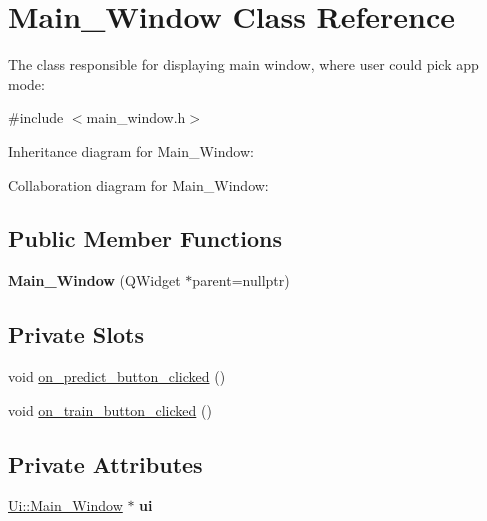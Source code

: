 \hypertarget{classMain__Window}{}\section{Main\+\_\+\+Window Class Reference}
\label{classMain__Window}


The class responsible for displaying main window, where user could pick app mode\+:  




{\ttfamily \#include $<$main\+\_\+window.\+h$>$}



Inheritance diagram for Main\+\_\+\+Window\+:


Collaboration diagram for Main\+\_\+\+Window\+:
\subsection*{Public Member Functions}
\begin{DoxyCompactItemize}
\item 
\mbox{\label{classMain__Window_a74de7d059afe56907e349276d60910d1}} 
{\bfseries Main\+\_\+\+Window} (Q\+Widget $\ast$parent=nullptr)
\end{DoxyCompactItemize}
\subsection*{Private Slots}
\begin{DoxyCompactItemize}
\item 
void \hyperlink{classMain__Window_a152cfc3e430cff4fb23f07ef43afaeb5}{on\+\_\+predict\+\_\+button\+\_\+clicked} ()
\item 
void \hyperlink{classMain__Window_a4081b8f068e82535e5a0f00924221c21}{on\+\_\+train\+\_\+button\+\_\+clicked} ()
\end{DoxyCompactItemize}
\subsection*{Private Attributes}
\begin{DoxyCompactItemize}
\item 
\mbox{\label{classMain__Window_a7d6d58b9addc257e7b469f8f465992fe}} 
\hyperlink{classUi_1_1Main__Window}{Ui\+::\+Main\+\_\+\+Window} $\ast$ {\bfseries ui}
\end{DoxyCompactItemize}


